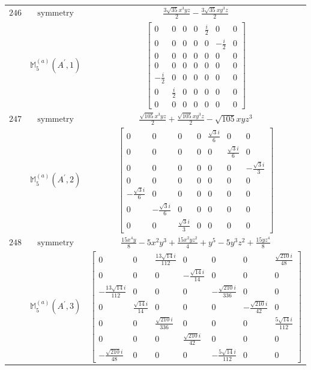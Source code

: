 \documentclass[fleqn,8pt,landscape]{jsarticle}
\begin{document}
\begin{longtable}{ccc}
$ 246 $ & $ \text{symmetry} $ & $ \frac{3 \sqrt{35} x^{3} y z}{2} - \frac{3 \sqrt{35} x y^{3} z}{2} $ \\
$  $ & $ \mathbb{M}_{5}^{(a)}(A^{\prime},1) $ & $ \begin{bmatrix} 0 & 0 & 0 & 0 & \frac{i}{2} & 0 & 0 \\ 0 & 0 & 0 & 0 & 0 & - \frac{i}{2} & 0 \\ 0 & 0 & 0 & 0 & 0 & 0 & 0 \\ 0 & 0 & 0 & 0 & 0 & 0 & 0 \\ - \frac{i}{2} & 0 & 0 & 0 & 0 & 0 & 0 \\ 0 & \frac{i}{2} & 0 & 0 & 0 & 0 & 0 \\ 0 & 0 & 0 & 0 & 0 & 0 & 0 \end{bmatrix} $ \\ \hline
$ 247 $ & $ \text{symmetry} $ & $ \frac{\sqrt{105} x^{3} y z}{2} + \frac{\sqrt{105} x y^{3} z}{2} - \sqrt{105} x y z^{3} $ \\
$  $ & $ \mathbb{M}_{5}^{(a)}(A^{\prime},2) $ & $ \begin{bmatrix} 0 & 0 & 0 & 0 & \frac{\sqrt{3} i}{6} & 0 & 0 \\ 0 & 0 & 0 & 0 & 0 & \frac{\sqrt{3} i}{6} & 0 \\ 0 & 0 & 0 & 0 & 0 & 0 & - \frac{\sqrt{3} i}{3} \\ 0 & 0 & 0 & 0 & 0 & 0 & 0 \\ - \frac{\sqrt{3} i}{6} & 0 & 0 & 0 & 0 & 0 & 0 \\ 0 & - \frac{\sqrt{3} i}{6} & 0 & 0 & 0 & 0 & 0 \\ 0 & 0 & \frac{\sqrt{3} i}{3} & 0 & 0 & 0 & 0 \end{bmatrix} $ \\ \hline
$ 248 $ & $ \text{symmetry} $ & $ \frac{15 x^{4} y}{8} - 5 x^{2} y^{3} + \frac{15 x^{2} y z^{2}}{4} + y^{5} - 5 y^{3} z^{2} + \frac{15 y z^{4}}{8} $ \\
$  $ & $ \mathbb{M}_{5}^{(a)}(A^{\prime},3) $ & $ \begin{bmatrix} 0 & 0 & \frac{13 \sqrt{14} i}{112} & 0 & 0 & 0 & \frac{\sqrt{210} i}{48} \\ 0 & 0 & 0 & - \frac{\sqrt{14} i}{14} & 0 & 0 & 0 \\ - \frac{13 \sqrt{14} i}{112} & 0 & 0 & 0 & - \frac{\sqrt{210} i}{336} & 0 & 0 \\ 0 & \frac{\sqrt{14} i}{14} & 0 & 0 & 0 & - \frac{\sqrt{210} i}{42} & 0 \\ 0 & 0 & \frac{\sqrt{210} i}{336} & 0 & 0 & 0 & \frac{5 \sqrt{14} i}{112} \\ 0 & 0 & 0 & \frac{\sqrt{210} i}{42} & 0 & 0 & 0 \\ - \frac{\sqrt{210} i}{48} & 0 & 0 & 0 & - \frac{5 \sqrt{14} i}{112} & 0 & 0 \end{bmatrix} $ \\ \hline

\end{longtable}
\end{document}

